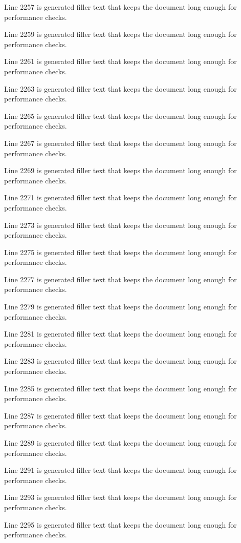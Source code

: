 Line 2257 is generated filler text that keeps the document long enough for performance checks.

Line 2259 is generated filler text that keeps the document long enough for performance checks.

Line 2261 is generated filler text that keeps the document long enough for performance checks.

Line 2263 is generated filler text that keeps the document long enough for performance checks.

Line 2265 is generated filler text that keeps the document long enough for performance checks.

Line 2267 is generated filler text that keeps the document long enough for performance checks.

Line 2269 is generated filler text that keeps the document long enough for performance checks.

Line 2271 is generated filler text that keeps the document long enough for performance checks.

Line 2273 is generated filler text that keeps the document long enough for performance checks.

Line 2275 is generated filler text that keeps the document long enough for performance checks.

Line 2277 is generated filler text that keeps the document long enough for performance checks.

Line 2279 is generated filler text that keeps the document long enough for performance checks.

Line 2281 is generated filler text that keeps the document long enough for performance checks.

Line 2283 is generated filler text that keeps the document long enough for performance checks.

Line 2285 is generated filler text that keeps the document long enough for performance checks.

Line 2287 is generated filler text that keeps the document long enough for performance checks.

Line 2289 is generated filler text that keeps the document long enough for performance checks.

Line 2291 is generated filler text that keeps the document long enough for performance checks.

Line 2293 is generated filler text that keeps the document long enough for performance checks.

Line 2295 is generated filler text that keeps the document long enough for performance checks.


